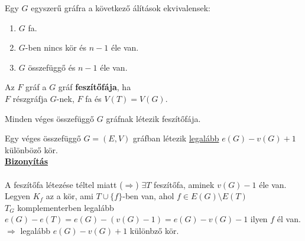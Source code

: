 \begin{frame} 
\begin{tcolorbox}[title={Tétel: Ekvivalens állítások n-pontú fákra}]
Egy $G$ egyszerű gráfra a következő álítások ekvivalensek:
\begin{enumerate}
\item $G$ fa.
\item $G$-ben nincs kör és $n - 1$ éle van.
\item $G$ összefüggő és $n - 1$ éle van.
\end{enumerate}
\end{tcolorbox}

\begin{tcolorbox}[title={Def.: Feszítőfa}]
Az $F$ gráf a $G$ gráf \textbf{feszítőfája}, ha\\
$F$ részgráfja $G$-nek, $F$ fa és $V(T) = V(G)$.
\end{tcolorbox}

\begin{tcolorbox}[title={Tétel: Feszítőfa létezése}]
Minden véges összefüggő $G$ gráfnak létezik feszítőfája.
\end{tcolorbox}

\end{frame}

\begin{frame} 
\begin{tcolorbox}[title={Tétel: Körök száma}]
Egy véges összefüggő $G = (E, V)$ gráfban létezik \underline{legalább} $e(G) - v(G) + 1$ különböző kör.\\
\tcblower
\msmallskip
\underline{\textbf{Bizonyítás}}\\
\mmedskip
\\
A feszítőfa létezése téltel miatt ($\Rightarrow$) $\exists T$ feszítőfa, aminek $v(G) - 1$ éle van.\\
Legyen $K_f$ az a kör, ami $T \cup \{f\}$-ben van, ahol $f \in E(G) \setminus E(T)$\\
$T_G$ komplementerben legalább $e(G) - e(T) = e(G) - (v(G) - 1) = e(G) - v(G) - 1$ ilyen $f$ él van.\\
$\Rightarrow$ legalább $e(G) - v(G) + 1$ különbző kör.
\end{tcolorbox}
\end{frame}

